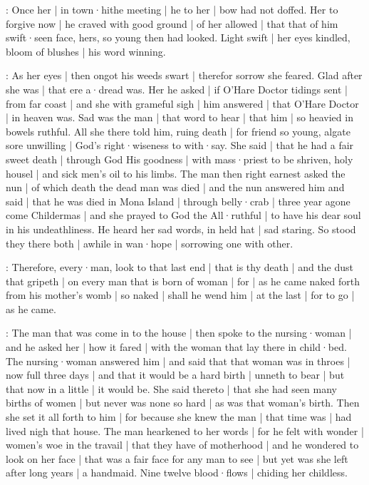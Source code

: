 \begin{omitted}

:
Once her |
in town·hithe meeting |
he to her |
bow had not doffed.
Her to forgive now |
he craved with good ground |
of her allowed |
that that of him swift·seen face,
hers,
so young then had looked.
Light swift |
her eyes kindled,
bloom of blushes |
his word winning.


:
As her eyes |
then ongot his weeds swart |
therefor sorrow she feared.
Glad after she was |
that ere a·dread was.
Her he asked |
if O'Hare Doctor tidings sent |
from far coast |
and she with grameful sigh |
him answered |
that O'Hare Doctor |
in heaven was.
Sad was the man |
that word to hear |
that him |
so heavied in bowels ruthful.
All she there told him,
ruing death |
for friend so young,
algate sore unwilling |
God's right·wiseness to with·say.
She said |
that he had a fair sweet death |
through God His goodness |
with mass·priest to be shriven,
holy housel |
and sick men's oil to his limbs.
The man then right earnest asked the nun |
of which death the dead man was died |
and the nun answered him and said |
that he was died in Mona Island |
through belly·crab |
three year agone come Childermas |
and she prayed to God the All·ruthful |
to have his dear soul in his undeathliness.
He heard her sad words,
in held hat |
sad staring.
So stood they there both |
awhile in wan·hope |
sorrowing one with other.
\end{omitted}


\begin{omitted}

:
Therefore,
every·man,
look to that last end |
that is thy death |
and the dust that gripeth |
on every man that is born of woman |
for |
as he came naked forth from his mother's womb |
so naked |
shall he wend him |
at the last |
for to go |
as he came.%
\end{omitted}


:
The man that was come in to the house |
then spoke to the nursing·woman |
and he asked her |
how it fared |
with the woman that lay there in child·bed.
The nursing·woman answered him |
and said that that woman was in throes |
now full three days |
and that it would be a hard birth |
unneth to bear |
but that now in a little |
it would be.
She said thereto |
that she had seen many births of women |
but never was none so hard |
as was that woman's birth.
Then she set it all forth to him |
for because she knew the man |
that time was |
had lived nigh that house.
The man hearkened to her words |
for he felt with wonder |
women's woe in the travail |
that they have of motherhood |
and he wondered to look on her face |
that was a fair face for any man to see |
but yet was she left after long years |
a handmaid.
Nine twelve blood·flows |
chiding her childless.

